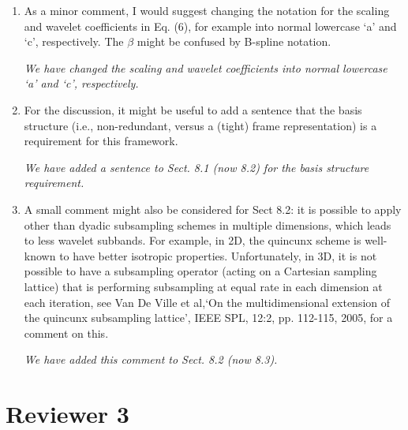 \documentclass{article}
\begin{document}
\begin{enumerate}
    \item As a minor comment, I would suggest changing the notation for the scaling and wavelet coefficients in Eq. (6), for example into normal lowercase `a' and `c', respectively. The $\beta$ might be confused by B-spline notation. 

	\emph{We have changed the scaling and wavelet coefficients into normal lowercase `a' and `c', respectively.}

\item For the discussion, it might be useful to add a sentence that the basis structure (i.e., non-redundant, versus a (tight) frame representation) is a requirement for this framework.

\emph{We have added a sentence to Sect. 8.1 (now 8.2) for the basis structure requirement.}

\item A small comment might also be considered for Sect 8.2: it is possible to apply other than dyadic subsampling schemes in multiple dimensions, which leads to less wavelet subbands. For example, in 2D, the quincunx scheme is well-known to have better isotropic properties. Unfortunately, in 3D, it is not possible to have a subsampling operator (acting on a Cartesian sampling lattice) that is performing subsampling at equal rate in each dimension at each iteration, see Van De Ville et al,`On the multidimensional extension of the quincunx subsampling lattice', IEEE SPL, 12:2, pp.  112-115, 2005, for a comment on this. 

\emph{We have added this comment to Sect. 8.2 (now 8.3).}



 

\end{enumerate}  

    \section{Reviewer 3}  
\end{document}
